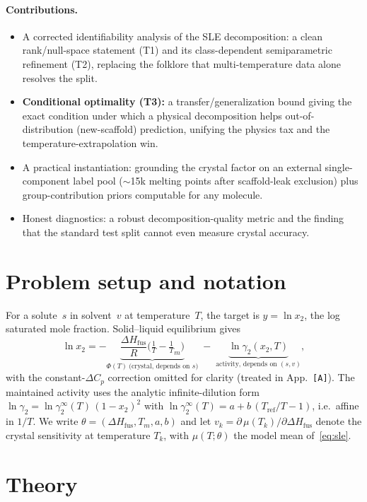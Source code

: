 \documentclass[11pt]{article}
\newcommand{\pending}[1][?]{{\color{red}\texttt{[#1]}}}
\newcommand{\lnx}{\ln x_2}
\newcommand{\Phicry}{\Phi}
\newcommand{\dHfus}{\Delta H_{\mathrm{fus}}}
\newcommand{\Tm}{T_m}
\newcommand{\lng}{\ln\gamma_2}
\newcommand{\Rgas}{R}
\begin{document}
\paragraph{Contributions.}
\begin{itemize}
  \item A corrected identifiability analysis of the SLE decomposition: a clean
  rank/null-space statement (T1) and its class-dependent semiparametric
  refinement (T2), replacing the folklore that multi-temperature data alone
  resolves the split.
  \item \textbf{Conditional optimality (T3):} a transfer/generalization bound
  giving the exact condition under which a physical decomposition helps
  out-of-distribution (new-scaffold) prediction, unifying the physics tax and
  the temperature-extrapolation win.
  \item A practical instantiation: grounding the crystal factor on an external
  single-component label pool ($\sim$15k melting points after scaffold-leak
  exclusion) plus group-contribution priors computable for any molecule.
  \item Honest diagnostics: a robust decomposition-quality metric and the finding
  that the standard test split cannot even measure crystal accuracy.
\end{itemize}

\section{Problem setup and notation}
\label{sec:setup}
For a solute~$s$ in solvent~$v$ at temperature~$T$, the target is
$y=\lnx$, the log saturated mole fraction. Solid--liquid equilibrium gives
\begin{equation}
  \lnx = -\underbrace{\frac{\dHfus}{\Rgas}\!\Big(\tfrac1T-\tfrac1\Tm\Big)}_{\Phicry(T)\ \text{(crystal, depends on $s$)}}
         \;-\;\underbrace{\lng(x_2,T)}_{\text{activity, depends on }(s,v)} ,
  \label{eq:sle}
\end{equation}
with the constant-$\Delta C_p$ correction omitted for clarity (treated in
App.~\pending[A]). The maintained activity uses the analytic infinite-dilution
form $\lng=\ln\gamma_2^\infty(T)\,(1-x_2)^2$ with
$\ln\gamma_2^\infty(T)=a+b\,(T_{\mathrm{ref}}/T-1)$, i.e.\ affine in $1/T$.
We write $\theta=(\dHfus,\Tm,a,b)$ and let
$v_k=\partial\,\mu(T_k)/\partial\dHfus$ denote the crystal sensitivity at
temperature $T_k$, with $\mu(T;\theta)$ the model mean of~\eqref{eq:sle}.

\section{Theory}
\label{sec:theory}
\end{document}
